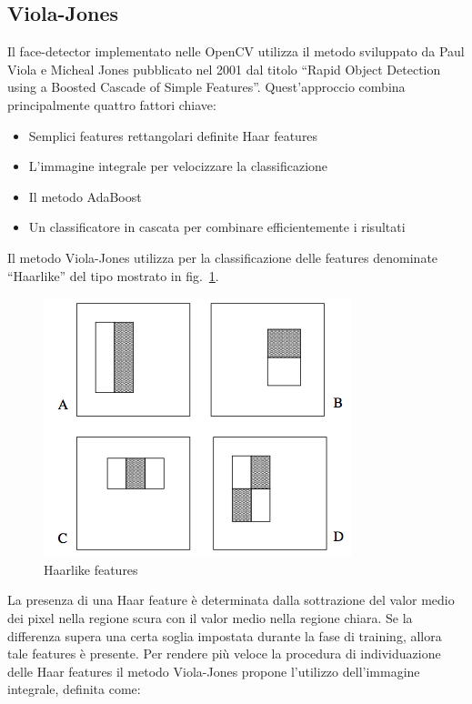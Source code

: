 \documentclass[a4paper,11pt]{article}
\newcommand{\cv}{OpenCV}
\begin{document}
\subsection{Viola-Jones}
\label{sec:vj}
Il face-detector implementato nelle \cv{} utilizza il metodo
sviluppato da Paul Viola e Micheal Jones pubblicato nel 2001 dal
titolo ``Rapid Object Detection using a Boosted Cascade of Simple
Features''. Quest'approccio combina principalmente quattro fattori
chiave:

\begin{itemize}
\item Semplici features rettangolari definite Haar features
\item L'immagine integrale per velocizzare la classificazione
\item Il metodo AdaBoost
\item Un classificatore in cascata per combinare efficientemente i
  risultati
\end{itemize}

Il metodo Viola-Jones utilizza per la classificazione delle features
denominate ``Haarlike'' del tipo mostrato in fig.~\ref{fig:haarlike}.

\begin{figure}[htbp]
  \centering
  \includegraphics[scale=0.5]{haarlike}
   \caption{Haarlike features}
  \label{fig:haarlike}
\end{figure}

La presenza di una Haar feature è determinata dalla sottrazione del
valor medio dei pixel nella regione scura con il valor medio nella
regione chiara. Se la differenza supera una certa soglia impostata
durante la fase di training, allora tale features è presente. Per
rendere più veloce la procedura di individuazione delle Haar features
il metodo Viola-Jones propone l'utilizzo dell'immagine integrale,
definita come:
\end{document}
